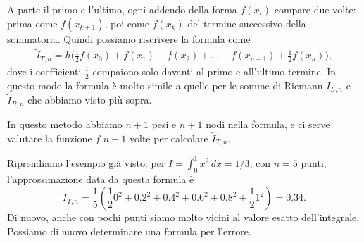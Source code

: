 \documentclass[a4paper]{report}
\theoremstyle{definiton}
\theoremstyle{remark}
\begin{document}

A parte il primo e l'ultimo, ogni addendo della forma $f(x_i)$ compare due volte: prima come $f(x_{k+1})$, poi come $f(x_k)$ del termine successivo della sommatoria. Quindi possiamo riscrivere la formula come
\begin{align*}
    \tilde{I}_{T,n} = h\biggl(\frac{1}{2} f(x_0) + f(x_1) + f(x_2) + \dots + f(x_{n-1}) + \frac{1}{2}f(x_n)  \biggr),
\end{align*}
dove i coefficienti $\frac{1}{2}$ compaiono solo davanti al primo e all'ultimo termine. In questo modo la formula è molto simile a quelle per le somme di Riemann $\tilde{I}_{L,n}$ e $\tilde{I}_{R,n}$ che abbiamo visto più sopra.

In questo metodo abbiamo $n+1$ pesi e $n+1$ nodi nella formula, e ci serve valutare la funzione $f$ $n+1$ volte per calcolare $\tilde{I}_{T,n}$.

Riprendiamo l'esempio già visto: per $I = \int_0^1 x^2\, dx = 1/3$, con $n=5$ punti, l'approssimazione data da questa formula è
\begin{equation} \label{esempio trapezi composito}
    \tilde{I}_{T,n} = \frac{1}{5} \left(\frac{1}{2}0^2 + 0.2^2 + 0.4^2 + 0.6^2 + 0.8^2 + \frac{1}{2}1^2\right) = 0.34.    
\end{equation}
Di nuovo, anche con pochi punti siamo molto vicini al valore esatto dell'integrale. Possiamo di nuovo determinare una formula per l'errore.
\end{document}
